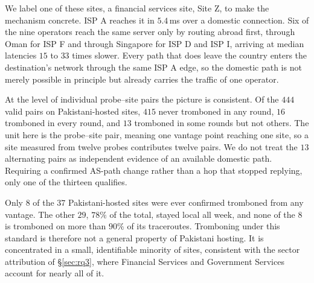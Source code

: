 \documentclass[sigconf,anonymous,10pt]{acmart}
\begin{document}
We label one of these sites, a financial services site, Site Z, to make the mechanism concrete. ISP A reaches it in $5.4$\,ms over a domestic connection. Six of the nine operators reach the same server only by routing abroad first, through Oman for ISP F and through Singapore for ISP D and ISP I, arriving at median latencies $15$ to $33$ times slower. Every path that does leave the country enters the destination's network through the same ISP A edge, so the domestic path is not merely possible in principle but already carries the traffic of one operator.

At the level of individual probe--site pairs the picture is consistent. Of the $444$ valid pairs on Pakistani-hosted sites, $415$ never tromboned in any round, $16$ tromboned in every round, and $13$ tromboned in some rounds but not others. The unit here is the probe--site pair, meaning one vantage point reaching one site, so a site measured from twelve probes contributes twelve pairs. We do not treat the $13$ alternating pairs as independent evidence of an available domestic path. Requiring a confirmed AS-path change rather than a hop that stopped replying, only one of the thirteen qualifies.

Only $8$ of the $37$ Pakistani-hosted sites were ever confirmed tromboned from any vantage. The other $29$, $78\%$ of the total, stayed local all week, and none of the $8$ is tromboned on more than $90\%$ of its traceroutes. Tromboning under this standard is therefore not a general property of Pakistani hosting. It is concentrated in a small, identifiable minority of sites, consistent with the sector attribution of \S\ref{sec:rq3}, where Financial Services and Government Services account for nearly all of it.


\end{document}
